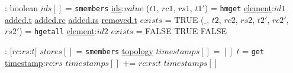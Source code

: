 \begin{algorithm}[h!]
\begin{algorithmic}[0]
     : boolean
      \State $ids[]$ = \texttt{smembers} \underline{ids}:$value$
        \State ($t1$, $rc1$, $rs1$, $t1'$) = \texttt{hmget} \underline{element}:$id1$ \underline{added.t} \underline{added.rc} \underline{added.rs} \underline{removed.t}
            \State $exists$ = TRUE
              \State ($\_$, $t2$, $rc2$, $rs2$, $t2'$, $rc2'$, $rs2'$) = \texttt{hgetall} \underline{element}:$id2$
                  \State $exists$ = FALSE
              \EndIf
            \EndFor
              \State \Return TRUE
            \EndIf
          \EndIf
        \EndIf 
      \EndFor
      \Return FALSE
    \EndProcedure
    
     : $[$$rc$:$rs$:$t$$]$
      \State $stores[]$ = \texttt{smembers} \underline{topology}
      \State $timestamps[]$ = $[]$
        \State $t$ = \texttt{get} \underline{timestamp}:$rc$:$rs$
        \State $timestamps[]$ += $rc$:$rs$:$t$
      \EndFor
      \Return $timestamps[]$
    \EndProcedure
  \end{algorithmic}
\end{algorithm}

